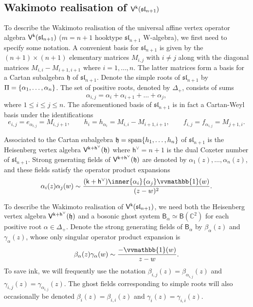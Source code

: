 \documentclass[10pt,a4paper]{amsart}
\numberwithin{equation}{section}
\renewcommand{\cong}{\simeq} %
\newcommand{\kk}{\mathsf{k}}   %
\newcommand{\wun}{\vvmathbb{1}}  %
\DeclarePairedDelimiter{\brac}{\lparen}{\rparen}   %
\DeclarePairedDelimiter{\set}{\lbrace}{\rbrace}
\newcommand{\fld}[1]{\mathbb{#1}}    %
\newcommand{\alg}[1]{\mathfrak{#1}}  %
\newcommand{\VOA}[1]{\mathsf{#1}}    %
\newcommand{\CC}{\fld{C}}
\newcommand{\SLA}[2]{\alg{#1}_{#2}}                      %
\newcommand{\slnpone}{\SLA{sl}{n+1}}
\newcommand{\cartan}{\mathfrak{h}}
\newcommand{\cox}{\mathsf{h}}                                        %
\newcommand{\dcox}{\coroot{\cox}}                                    %
\newcommand{\proots}{\Delta_+}                                       %
\newcommand{\sroots}{\Pi}                                            %
\newcommand{\sroot}[1]{\alpha_{#1}}                                  %
\newcommand{\prvec}[1]{e_{#1}}                                        %
\newcommand{\cvec}[1]{h_{#1}}                                        %
\newcommand{\nrvec}[1]{f_{#1}}                                       %
\newcommand{\coroot}[1]{#1^{\vee}}                                   %
\newcommand{\uaffvoa}[2]{\VOA{V}^{#1}\brac{#2}}                   %
\newcommand{\bgvoa}{\VOA{B}}                                      %
\theoremstyle{plain}
\begin{document}
\subsection{Wakimoto realisation of \texorpdfstring{$\uaffvoa{\kk}{\slnpone}$}{Vk(sln+1)}} \label{subsec:WakAff}
To describe the Wakimoto realisation of the universal affine vertex operator algebra $\uaffvoa{\kk}{\slnpone}$ ($m=n+1$ hooktype $\slnpone$ W-algebra), we first need to specify some notation. A convenient basis for $\slnpone$ is given by the $(n+1) \times (n+1)$ elementary matrices $M_{i,j}$ with $i\neq j$ along with the diagonal matrices $M_{i,i} - M_{i+1,i+1}$ where $i=1, \dots, n$. The latter matrices form a basis for a Cartan subalgebra $\cartan$ of $\slnpone$. Denote the simple roots of $\slnpone$ by $\sroots = \set{\sroot{1},\dots, \sroot{n}}$. The set of positive roots, denoted by $\proots$, consists of sums
%
\begin{equation}
    \sroot{i,j} = \sroot{i} + \sroot{i+1} + \dots + \sroot{j},
\end{equation}
%
where $1 \leq i \leq j \leq n$. The aforementioned basis of $\slnpone$ is in fact a Cartan-Weyl basis under the identifications
%
\begin{equation}
    \prvec{i,j} = \prvec{\sroot{i,j}} = M_{i,j+1}, \qquad 
    \cvec{i} = \cvec{\sroot{i}} = M_{i,i}-M_{i+1,i+1}, \qquad
    \nrvec{i,j} = \nrvec{\sroot{i,j}} = M_{j+1,i}.
    \end{equation}

Associated to the Cartan subalgebra $\cartan=\text{span}\set{\cvec{1},\dots,\cvec{n}}$ of $\slnpone$ is the Heisenberg vertex algebra $\uaffvoa{\kk+\dcox}{\cartan}$ where $\dcox=n+1$ is the dual Coxeter number of $\slnpone$. Strong generating fields of $\uaffvoa{\kk+\dcox}{\cartan}$ are denoted by $\alpha_1(z), \dots, \alpha_n(z)$, and these fields satisfy the operator product expansions
%
\begin{equation}
    \alpha_i(z) \alpha_j(w) \sim \frac{(\kk+\dcox)\inner{\sroot{i}}{\sroot{j}} \wun(w)}{(z-w)^2}.
\end{equation}

To describe the Wakimoto realisation of $\uaffvoa{\kk}{\slnpone}$, we need both the  Heisenberg vertex algebra $\uaffvoa{\kk+\dcox}{\cartan}$ and a bosonic ghost system $\bgvoa_{\alpha} \cong \bgvoa(\CC^2)$ for each positive root $\alpha \in \proots$. Denote the strong generating fields of $\bgvoa_{\alpha}$ by $\beta_{\alpha}(z)$ and $\gamma_{\alpha}(z)$, whose only singular operator product expansion is
%
\begin{equation}
    \beta_\alpha(z) \gamma_\alpha(w) \sim \frac{-\wun(w)}{z-w}.
\end{equation}
%
To save ink, we will frequently use the notation $\beta_{i,j}(z)=\beta_{\sroot{i,j}}(z)$ and $\gamma_{i,j}(z)=\gamma_{\sroot{i,j}}(z)$. The ghost fields corresponding to simple roots will also occasionally be denoted $\beta_i(z) = \beta_{i,i}(z)$ and $\gamma_i(z) = \gamma_{i,i}(z)$. 
\end{document}
